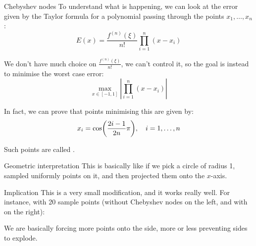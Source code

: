 \documentclass[a4paper]{article}
\begin{document}
\begin{parag}{Chebyshev nodes}
    To understand what is happening, we can look at the error given by the Taylor formula for a polynomial passing through the points $x_1, \ldots, x_n$: 
    \[E\left(x\right) = \frac{f^{\left(n\right)}\left(\xi\right)}{n!} \prod_{i=1}^{n} \left(x - x_i\right)\]

    We don't have much choice on $\frac{f^{\left(n\right)}\left(\xi\right)}{n!}$, we can't control it, so the goal is instead to minimise the worst case error: 
    \[\max_{x \in \left[-1, 1\right]} \left|\prod_{i=1}^{n} \left(x - x_i\right)\right|\]

    In fact, we can prove that points minimising this are given by: 
    \[x_i = \cos\left(\frac{2i - 1}{2n} \pi\right), \mathspace i = 1, \ldots, n\]

    Such points are called .
    
    \begin{subparag}{Geometric interpretation}
        This is basically like if we pick a circle of radius 1, sampled uniformly points on it, and then projected them onto the $x$-axis.
    \end{subparag}

    \begin{subparag}{Implication}
        This is a very small modification, and it works really well. For instance, with 20 sample points (without Chebyshev nodes on the left, and with on the right):
        \begin{center}
        \begin{minipage}{0.48\textwidth}
        \end{minipage}
        \hfill
        \begin{minipage}{0.48\textwidth}
        \end{minipage}
        \end{center}

        We are basically forcing more points onto the side, more or less preventing sides to explode.
    \end{subparag}
\end{parag}
\end{document}
